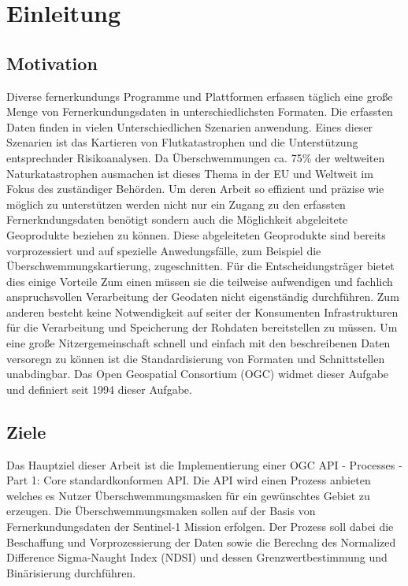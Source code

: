 \newpage
\restoregeometry
\section{Einleitung}
\subsection{Motivation}
Diverse fernerkundungs Programme und Plattformen erfassen täglich eine große Menge 
von Fernerkundungsdaten in unterschiedlichsten Formaten. Die erfassten Daten finden 
in vielen Unterschiedlichen Szenarien anwendung. Eines dieser Szenarien ist das Kartieren 
von Flutkatastrophen und die Unterstützung entsprechnder Risikoanalysen. Da Überschwemmungen 
ca. 75\% der weltweiten Naturkatastrophen ausmachen ist dieses Thema in der EU und Weltweit 
im Fokus des zuständiger Behörden. Um deren Arbeit so effizient und präzise wie möglich zu 
unterstützen werden nicht nur ein Zugang zu den erfassten Fernerkndungsdaten 
benötigt sondern auch die Möglichkeit abgeleitete Geoprodukte beziehen 
zu können. Diese abgeleiteten Geoprodukte sind bereits vorprozessiert und auf spezielle Anwedungsfälle,
zum Beispiel die Überschwemmungskartierung, zugeschnitten. Für die Entscheidungsträger bietet dies einige 
Vorteile Zum einen müssen sie die teilweise aufwendigen und fachlich anspruchsvollen Verarbeitung der 
Geodaten nicht eigenständig durchführen. Zum anderen besteht keine Notwendigkeit auf seiter der 
Konsumenten Infrastrukturen für die Verarbeitung und Speicherung der Rohdaten bereitstellen zu müssen.
Um eine große Nitzergemeinschaft schnell und einfach mit den beschreibenen Daten versoregn zu können 
ist die Standardisierung von Formaten und Schnittstellen unabdingbar. Das Open Geospatial Consortium (OGC)
widmet dieser Aufgabe und definiert seit 1994 dieser Aufgabe. 
\subsection{Ziele}
Das Hauptziel dieser Arbeit ist die Implementierung einer OGC API - Processes - Part 1: Core standardkonformen
API. Die API wird einen Prozess anbieten welches es Nutzer Überschwemmungsmasken für ein gewünschtes Gebiet 
zu erzeugen. Die Überschwemmungsmaken sollen auf der Basis von Fernerkundungsdaten der Sentinel-1 Mission erfolgen.
Der Prozess soll dabei die Beschaffung und Vorprozessierung der Daten sowie die Berechng des Normalized Difference 
Sigma-Naught Index (NDSI) und dessen Grenzwertbestimmung und Binärisierung durchführen.  
